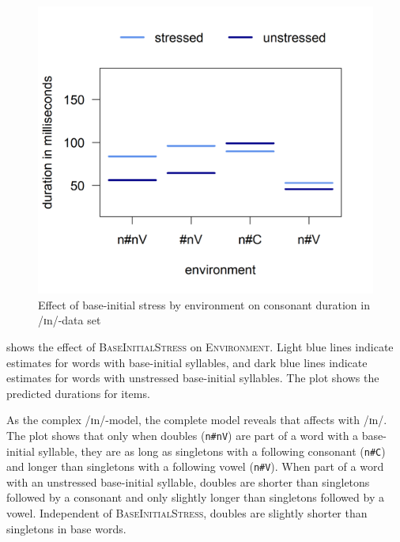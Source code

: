 	\begin{figure}
		 
		\includegraphics [scale=0.5] {images/Experiment/InModelCompleteInterEnvStress}
		
		\caption{Effect of base-initial stress by environment on consonant duration in /ɪn/-data set}	
		\label{fig:Env Stress In complete experiment} 
	\end{figure}%








 shows the effect of \textsc{BaseInitialStress} on \textsc{Environment}. Light blue lines indicate estimates for words with  base-initial syllables, and dark blue lines indicate estimates for words with unstressed base-initial syllables. The plot shows the predicted durations for  items.



As the complex /ɪn/-model, the complete model reveals that  affects  with /ɪn/. 
The plot shows that only when doubles (\texttt{n\#nV}) are part of a word with a  base-initial syllable, they are as long as singletons with a following consonant  (\texttt{n\#C}) and longer than singletons with a following vowel  (\texttt{n\#V}). When part of a word with an unstressed base-initial syllable, doubles are shorter than singletons followed by a consonant and only slightly longer than singletons followed by a vowel. Independent of \textsc{BaseInitialStress}, doubles are slightly shorter than singletons in base words.




